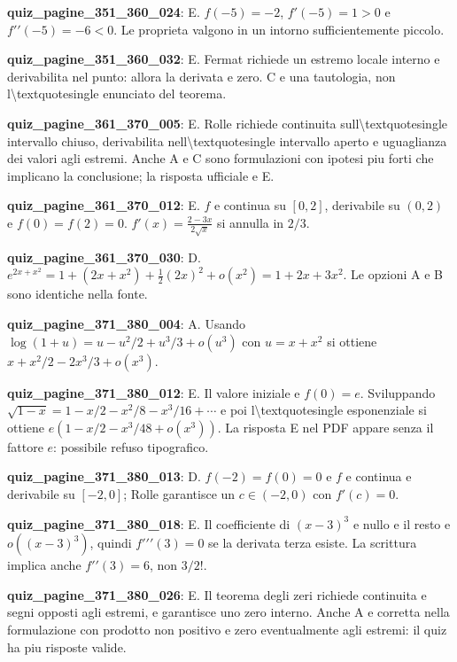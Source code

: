 \documentclass[11pt,a4paper]{article}
\newcounter{quiz}
\begin{document}
\noindent\textbf{quiz\_pagine\_351\_360\_024}: E. $f(-5)=-2$, $f\prime(-5)=1>0$ e $f\prime\prime(-5)=-6<0$. Le proprieta valgono in un intorno sufficientemente piccolo.\par\medskip
\noindent\textbf{quiz\_pagine\_351\_360\_032}: E. Fermat richiede un estremo locale interno e derivabilita nel punto: allora la derivata e zero. C e una tautologia, non l\textbackslash{}textquotesingle enunciato del teorema.\par\medskip
\noindent\textbf{quiz\_pagine\_361\_370\_005}: E. Rolle richiede continuita sull\textbackslash{}textquotesingle intervallo chiuso, derivabilita nell\textbackslash{}textquotesingle intervallo aperto e uguaglianza dei valori agli estremi. Anche A e C sono formulazioni con ipotesi piu forti che implicano la conclusione; la risposta ufficiale e E.\par\medskip
\noindent\textbf{quiz\_pagine\_361\_370\_012}: E. $f$ e continua su $[0,2]$, derivabile su $(0,2)$ e $f(0)=f(2)=0$. $f\prime(x)=\frac{2-3x}{2\sqrt x}$ si annulla in $2/3$.\par\medskip
\noindent\textbf{quiz\_pagine\_361\_370\_030}: D. $e^{2x+x^2}=1+(2x+x^2)+\frac12(2x)^2+o(x^2)=1+2x+3x^2$. Le opzioni A e B sono identiche nella fonte.\par\medskip
\noindent\textbf{quiz\_pagine\_371\_380\_004}: A. Usando $\log(1+u)=u-u^2/2+u^3/3+o(u^3)$ con $u=x+x^2$ si ottiene $x+x^2/2-2x^3/3+o(x^3)$.\par\medskip
\noindent\textbf{quiz\_pagine\_371\_380\_012}: E. Il valore iniziale e $f(0)=e$. Sviluppando $\sqrt{1-x}=1-x/2-x^2/8-x^3/16+\cdots$ e poi l\textbackslash{}textquotesingle esponenziale si ottiene $e(1-x/2-x^3/48+o(x^3))$. La risposta E nel PDF appare senza il fattore $e$: possibile refuso tipografico.\par\medskip
\noindent\textbf{quiz\_pagine\_371\_380\_013}: D. $f(-2)=f(0)=0$ e $f$ e continua e derivabile su $[-2,0]$; Rolle garantisce un $c\in(-2,0)$ con $f\prime(c)=0$.\par\medskip
\noindent\textbf{quiz\_pagine\_371\_380\_018}: E. Il coefficiente di $(x-3)^3$ e nullo e il resto e $o((x-3)^3)$, quindi $f\prime\prime\prime(3)=0$ se la derivata terza esiste. La scrittura implica anche $f\prime\prime(3)=6$, non $3/2!$.\par\medskip
\noindent\textbf{quiz\_pagine\_371\_380\_026}: E. Il teorema degli zeri richiede continuita e segni opposti agli estremi, e garantisce uno zero interno. Anche A e corretta nella formulazione con prodotto non positivo e zero eventualmente agli estremi: il quiz ha piu risposte valide.\par\medskip
\end{document}
